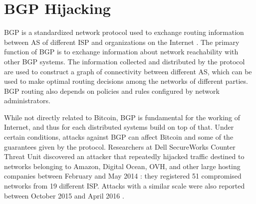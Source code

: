 \section{BGP Hijacking}
\ac{BGP} is a standardized network protocol used to exchange routing information between \ac{AS} \cite{autonomous_systems_wikipedia} of different \ac{ISP} and organizations on the Internet \cite{rfc4271, bgp_wikipedia}.
The primary function of \ac{BGP} is to exchange information about network reachability with other \ac{BGP} systems.
The information collected and distributed by the protocol are used to construct a graph of connectivity between different \ac{AS}, which can be used to make optimal routing decisions among the networks of different parties.
\ac{BGP} routing also depends on policies and rules configured by network administrators.

\medskip
While not directly related to Bitcoin, \ac{BGP} is fundamental for the working of Internet, and thus for each distributed systems build on top of that.
Under certain conditions, attacks against \ac{BGP} can affect Bitcoin and some of the guarantees given by the protocol.
Researchers at Dell SecureWorks Counter Threat Unit discovered an attacker that repeatedly hijacked traffic destined to networks belonging to Amazon, Digital Ocean, OVH, and other large hosting companies between February and May 2014 \cite{bgp_hijacking_secureworks}:
they registered \num{51} compromised networks from \num{19} different \ac{ISP}.
Attacks with a similar scale were also reported between October 2015 and April 2016 \cite{hijacking_bitcoin_2017, bgpstream}.

\pagebreak

